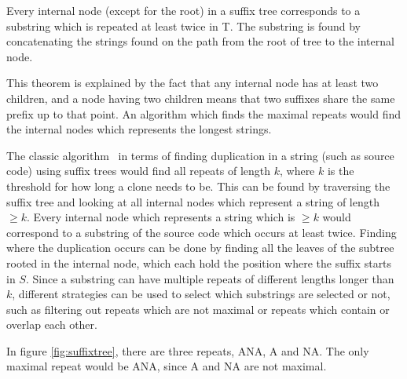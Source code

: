 \begin{theorem}

    Every internal node (except for the root) in a suffix tree corresponds to a substring
    which is repeated at least twice in T. The substring is found by concatenating the
    strings found on the path from the root of tree to the internal node.

\end{theorem}

This theorem is explained by the fact that any internal node has at least two children, and a
node having two children means that two suffixes share the same prefix up to that point.
An algorithm which finds the maximal repeats would find the internal nodes which
represents the longest strings. 

The classic algorithm~\cite{Zibran_real_time_search, GodeIncrementalCloneDetection} in
terms of finding duplication in a string (such as source code) using suffix trees would
find all repeats of length $k$, where $k$ is the threshold for how long a clone needs to
be. This can be found by traversing the suffix tree and looking at all internal nodes
which represent a string of length $\geq k$. Every internal node which represents a string
which is $\geq k$ would correspond to a substring of the source code which occurs at least
twice. Finding where the duplication occurs can be done by finding all the leaves of the
subtree rooted in the internal node, which each hold the position where the suffix starts in
$S$. Since a substring can have multiple repeats of different lengths longer than $k$,
different strategies can be used to select which substrings are selected or not, such as
filtering out repeats which are not maximal or repeats which contain or overlap each other.

In figure \ref{fig:suffixtree}, there are three repeats, ANA, A and NA. The only maximal
repeat would be ANA, since A and NA are not maximal.


